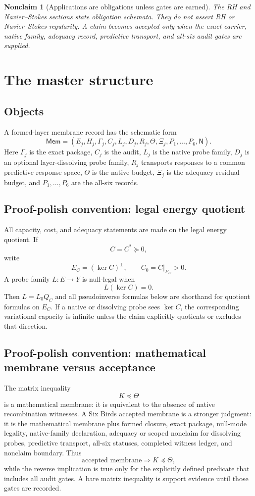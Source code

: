 \documentclass[11pt]{article}
\newtheorem{nonclaim}[theorem]{Nonclaim}
\begin{document}
\begin{nonclaim}[Applications are obligations unless gates are earned]
The RH and Navier--Stokes sections state obligation schemata.  They do not assert RH or Navier--Stokes regularity.  A claim becomes accepted only when the exact carrier, native family, adequacy record, predictive transport, and all-six audit gates are supplied.
\end{nonclaim}

\section{The master structure}

\subsection{Objects}
A formed-layer membrane record has the schematic form
\[
  \mathsf{Mem}=(E_j,H_j,\Gamma_j,C_j,L_j,D_j,R_j,\Theta,\Xi_j,P_1,\ldots,P_6,\mathsf N).
\]
Here \(\Gamma_j\) is the exact package, \(C_j\) is the audit, \(L_j\) is the native probe family, \(D_j\) is an optional layer-dissolving probe family, \(R_j\) transports responses to a common predictive response space, \(\Theta\) is the native budget, \(\Xi_j\) is the adequacy residual budget, and \(P_1,\ldots,P_6\) are the all-six records.


\subsection{Proof-polish convention: legal energy quotient}
All capacity, cost, and adequacy statements are made on the legal energy quotient.  If
\[
  C=C^*\succeq0,
\]
write
\[
  E_C=(\ker C)^\perp,
  \qquad C_0=C|_{E_C}>0.
\]
A probe family \(L:E\to Y\) is null-legal when
\[
  L(\ker C)=0.
\]
Then \(L=L_0Q_C\) and all pseudoinverse formulas below are shorthand for quotient formulas on \(E_C\).  If a native or dissolving probe sees \(\ker C\), the corresponding variational capacity is infinite unless the claim explicitly quotients or excludes that direction.

\subsection{Proof-polish convention: mathematical membrane versus acceptance}
The matrix inequality
\[
  K\preceq \Theta
\]
is a mathematical membrane: it is equivalent to the absence of native recombination witnesses.  A Six Birds accepted membrane is a stronger judgment: it is the mathematical membrane plus formed closure, exact package, null-mode legality, native-family declaration, adequacy or scoped nonclaim for dissolving probes, predictive transport, all-six statuses, completed witness ledger, and nonclaim boundary.  Thus
\[
  \text{accepted membrane}\Rightarrow K\preceq\Theta,
\]
while the reverse implication is true only for the explicitly defined predicate that includes all audit gates.  A bare matrix inequality is support evidence until those gates are recorded.
\end{document}
